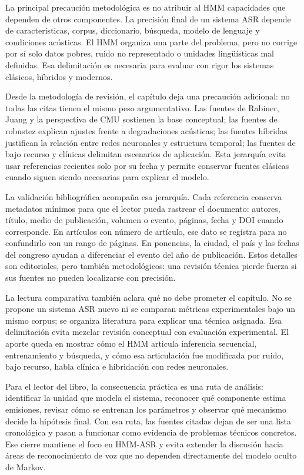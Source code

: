 La principal precaución metodológica es no atribuir al HMM capacidades que dependen de otros componentes. La precisión final de un sistema ASR depende de características, corpus, diccionario, búsqueda, modelo de lenguaje y condiciones acústicas. El HMM organiza una parte del problema, pero no corrige por sí solo datos pobres, ruido no representado o unidades lingüísticas mal definidas. Esa delimitación es necesaria para evaluar con rigor los sistemas clásicos, híbridos y modernos.


Desde la metodología de revisión, el capítulo deja una precaución adicional: no todas las citas tienen el mismo peso argumentativo. Las fuentes de Rabiner, Juang y la perspectiva de CMU sostienen la base conceptual; las fuentes de robustez explican ajustes frente a degradaciones acústicas; las fuentes híbridas justifican la relación entre redes neuronales y estructura temporal; las fuentes de bajo recurso y clínicas delimitan escenarios de aplicación. Esta jerarquía evita usar referencias recientes solo por su fecha y permite conservar fuentes clásicas cuando siguen siendo necesarias para explicar el modelo.

La validación bibliográfica acompaña esa jerarquía. Cada referencia conserva metadatos mínimos para que el lector pueda rastrear el documento: autores, título, medio de publicación, volumen o evento, páginas, fecha y DOI cuando corresponde. En artículos con número de artículo, ese dato se registra para no confundirlo con un rango de páginas. En ponencias, la ciudad, el país y las fechas del congreso ayudan a diferenciar el evento del año de publicación. Estos detalles son editoriales, pero también metodológicos: una revisión técnica pierde fuerza si sus fuentes no pueden localizarse con precisión.

La lectura comparativa también aclara qué no debe prometer el capítulo. No se propone un sistema ASR nuevo ni se comparan métricas experimentales bajo un mismo corpus; se organiza literatura para explicar una técnica asignada. Esa delimitación evita mezclar revisión conceptual con evaluación experimental. El aporte queda en mostrar cómo el HMM articula inferencia secuencial, entrenamiento y búsqueda, y cómo esa articulación fue modificada por ruido, bajo recurso, habla clínica e hibridación con redes neuronales.

Para el lector del libro, la consecuencia práctica es una ruta de análisis: identificar la unidad que modela el sistema, reconocer qué componente estima emisiones, revisar cómo se entrenan los parámetros y observar qué mecanismo decide la hipótesis final. Con esa ruta, las fuentes citadas dejan de ser una lista cronológica y pasan a funcionar como evidencia de problemas técnicos concretos. Ese cierre mantiene el foco en HMM-ASR y evita extender la discusión hacia áreas de reconocimiento de voz que no dependen directamente del modelo oculto de Markov.

